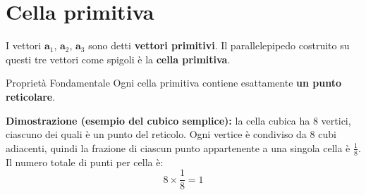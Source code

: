 \begin{center}
\vspace{1cm}


\end{center}
\vspace{0.5cm}

\section{Cella primitiva}

I vettori $\mathbf{a}_1$, $\mathbf{a}_2$, $\mathbf{a}_3$ sono detti \textbf{vettori primitivi}. Il parallelepipedo costruito su questi tre vettori come spigoli è la \textbf{cella primitiva}.

\begin{equazione}{Proprietà Fondamentale}
Ogni cella primitiva contiene esattamente \textbf{un punto reticolare}.
\end{equazione}

\textbf{Dimostrazione (esempio del cubico semplice):} la cella cubica ha 8 vertici, ciascuno dei quali è un punto del reticolo. Ogni vertice è condiviso da 8 cubi adiacenti, quindi la frazione di ciascun punto appartenente a una singola cella è $\frac{1}{8}$. Il numero totale di punti per cella è:
$$8 \times \frac{1}{8} = 1$$

